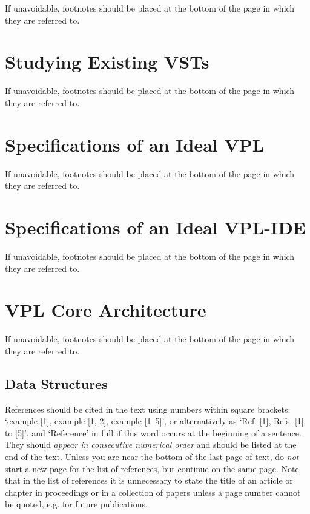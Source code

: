 \documentclass[aps,prb,twocolumn,superscriptaddress,floatfix,longbibliography]{revtex4-2}
\begin{document}
If unavoidable, footnotes should be placed at the bottom
of the page in which they are referred to.

\section{Studying Existing VSTs}

If unavoidable, footnotes should be placed at the bottom
of the page in which they are referred to.

\section{Specifications of an Ideal VPL}

If unavoidable, footnotes should be placed at the bottom
of the page in which they are referred to.

\section{Specifications of an Ideal VPL-IDE}

If unavoidable, footnotes should be placed at the bottom
of the page in which they are referred to.

\section{VPL Core Architecture}

If unavoidable, footnotes should be placed at the bottom
of the page in which they are referred to.

\subsection{Data Structures}

References should be cited  in the text using numbers within
square brackets: `example [1],
example [1, 2], example [1--5]', or alternatively as
`Ref. [1], Refs. [1] to [5]', and
`Reference' in full if this word occurs at the
beginning of a sentence.
They should {\it appear in consecutive numerical order}
and should be listed at the end of the text.
Unless you are near the bottom of the last page of text,
do {\it not} start a new page for the list of
references, but continue on the same page.
Note that in the list of references it is
unnecessary to state the title of an article or chapter in
proceedings or in a collection of papers unless a page number
cannot be quoted, e.g. for future publications.
\end{document}
